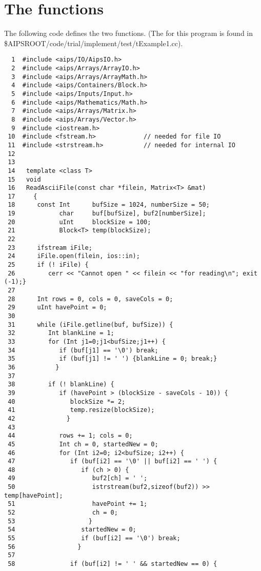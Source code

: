 \newpage
\section{The functions}

	The following code defines the two functions.
(The 
for this program is found in 
\$AIPSROOT/code/trial/implement/test/tExample1.cc). 

\begin{verbatim}
  1  #include <aips/IO/AipsIO.h>
  2  #include <aips/Arrays/ArrayIO.h>
  3  #include <aips/Arrays/ArrayMath.h>
  4  #include <aips/Containers/Block.h>
  5  #include <aips/Inputs/Input.h>
  6  #include <aips/Mathematics/Math.h>
  7  #include <aips/Arrays/Matrix.h>
  8  #include <aips/Arrays/Vector.h>
  9  #include <iostream.h>
 10  #include <fstream.h>             // needed for file IO
 11  #include <strstream.h>           // needed for internal IO
 12
 13
 14   template <class T>
 15   void
 16   ReadAsciiFile(const char *filein, Matrix<T> &mat)
 17     {
 18      const Int      bufSize = 1024, numberSize = 50;
 19            char     buf[bufSize], buf2[numberSize];
 20            uInt     blockSize = 100;
 21            Block<T> temp(blockSize);
 22
 23      ifstream iFile;
 24      iFile.open(filein, ios::in);
 25      if (! iFile) {
 26         cerr << "Cannot open " << filein << "for reading\n"; exit (-1);}
 27
 28      Int rows = 0, cols = 0, saveCols = 0;
 29      uInt havePoint = 0;
 30
 31      while (iFile.getline(buf, bufSize)) {
 32         Int blankLine = 1;
 33         for (Int j1=0;j1<bufSize;j1++) {
 34            if (buf[j1] == '\0') break;
 35            if (buf[j1] != ' ') {blankLine = 0; break;}
 36           }
 37
 38         if (! blankLine) {
 39            if (havePoint > (blockSize - saveCols - 10)) {
 40               blockSize *= 2;
 41               temp.resize(blockSize);
 42              }
 43
 44            rows += 1; cols = 0;
 45            Int ch = 0, startedNew = 0;
 46            for (Int i2=0; i2<bufSize; i2++) {
 47               if (buf[i2] == '\0' || buf[i2] == ' ') {
 48                  if (ch > 0) {
 49                     buf2[ch] = ' ';
 50                     istrstream(buf2,sizeof(buf2)) >>  temp[havePoint];
 51                     havePoint += 1;
 52                     ch = 0;
 53                    }
 54                  startedNew = 0;
 55                  if (buf[i2] == '\0') break;
 56                 }
 57
 58               if (buf[i2] != ' ' && startedNew == 0) {

\end{verbatim}
